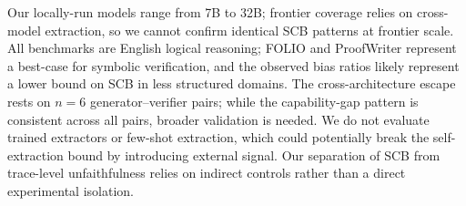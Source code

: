  Our locally-run models range from 7B to 32B; frontier coverage relies on cross-model extraction, so we cannot confirm identical SCB patterns at frontier scale. All benchmarks are English logical reasoning; FOLIO and ProofWriter represent a best-case for symbolic verification, and the observed bias ratios likely represent a lower bound on SCB in less structured domains. The cross-architecture escape rests on $n{=}6$ generator--verifier pairs; while the capability-gap pattern is consistent across all pairs, broader validation is needed. We do not evaluate trained extractors or few-shot extraction, which could potentially break the self-extraction bound by introducing external signal. Our separation of SCB from trace-level unfaithfulness relies on indirect controls rather than a direct experimental isolation.
